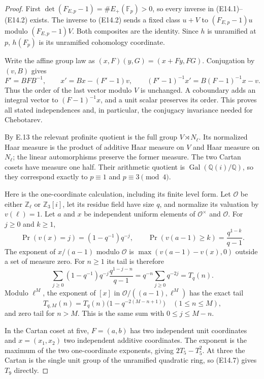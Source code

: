 \begin{proof}
First $\det(F_{E,p}-1)=\#E_+(\mathbb F_p)>0$, so every inverse
in (E14.1)--(E14.2) exists.  The inverse to (E14.2) sends a
fixed class $u+V$ to $(F_{E,p}-1)u$ modulo $(F_{E,p}-1)V$.
Both composites are the identity.  Since $h$ is unramified at
$p$, $h(F_p)$ is its unramified cohomology coordinate.

Write the affine group law as
$(x,F)(y,G)=(x+Fy,FG)$.
Conjugation by $(v,B)$ gives
\[
 F'=BFB^{-1},\qquad x'=Bx-(F'-1)v,\qquad
 (F'-1)^{-1}x'=B(F-1)^{-1}x-v.
 \tag{E14.6}
\]
Thus the order of the last vector modulo $V$ is unchanged.
A coboundary adds an integral vector to $(F-1)^{-1}x$, and
a unit scalar preserves its order.  This proves all stated
independences and, in particular, the conjugacy invariance
needed for Chebotarev.

By E.13 the relevant profinite quotient is the full group
$V\rtimes N_\ell$.  Its normalized Haar measure is the product
of additive Haar measure on $V$ and Haar measure on $N_\ell$;
the linear automorphisms preserve the former measure.
The two Cartan cosets have measure one half.  Their arithmetic
quotient is $\operatorname{Gal}(\mathbb Q(i)/\mathbb Q)$, so they
correspond exactly to $p\equiv1$ and $p\equiv3\pmod4$.

Here is the one-coordinate calculation, including its finite
level form.  Let $\mathcal O$ be either $\mathbb Z_\ell$ or
$\mathbb Z_3[i]$, let its residue field have size $q$, and
normalize its valuation by $v(\ell)=1$.  Let $a$ and $x$ be
independent uniform elements of $\mathcal O^\times$ and
$\mathcal O$.  For $j\ge0$ and $k\ge1$,
\[
 \Pr(v(x)=j)=(1-q^{-1})q^{-j},\qquad
 \Pr(v(a-1)\ge k)=\frac{q^{1-k}}{q-1}.
\]
The exponent of $x/(a-1)$ modulo $\mathcal O$ is
$\max(v(a-1)-v(x),0)$ outside a set of measure zero.
For $n\ge1$ its tail is therefore
\[
 \sum_{j\ge0}(1-q^{-1})q^{-j}
          \frac{q^{1-j-n}}{q-1}
   =q^{-n}\sum_{j\ge0}q^{-2j}
   =T_q(n).
 \tag{E14.7}
\]
Modulo $\ell^M$, the exponent of $[x]$ in
$\mathcal O/((a-1),\ell^M)$ has the exact tail
\[
 T_{q,M}(n)=T_q(n)\bigl(1-q^{-2(M-n+1)}\bigr)
       \quad(1\le n\le M),
 \tag{E14.8}
\]
and zero tail for $n>M$.  This is the same sum with
$0\le j\le M-n$.

In the Cartan coset at five, $F=(a,b)$ has two independent
unit coordinates and $x=(x_1,x_2)$ two independent additive
coordinates.  The exponent is the maximum of the two
one-coordinate exponents, giving $2T_5-T_5^2$.
At three the Cartan is the single unit group of the unramified
quadratic ring, so (E14.7) gives $T_9$ directly.


\end{proof}
